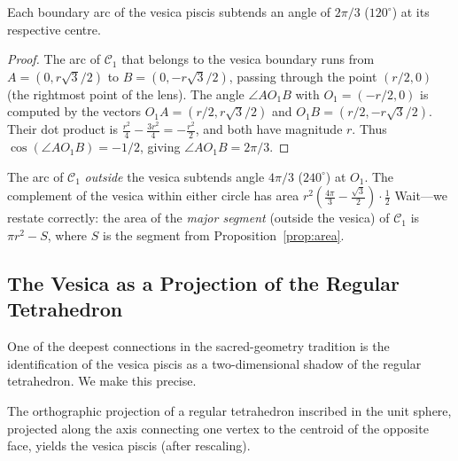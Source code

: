 \begin{lemma}\label{lem:arc-angle}
Each boundary arc of the vesica piscis subtends an angle of
\(2\pi/3\) (\(120^\circ\)) at its respective centre.
\end{lemma}

\begin{proof}
The arc of \(\mathcal{C}_1\) that belongs to the vesica boundary
runs from \(A = (0, r\sqrt{3}/2)\) to \(B = (0, -r\sqrt{3}/2)\),
passing through the point \((r/2, 0)\) (the rightmost point of the
lens).
The angle \(\angle A O_1 B\) with \(O_1 = (-r/2, 0)\) is computed by the
vectors \(O_1 A = (r/2, r\sqrt{3}/2)\) and \(O_1 B = (r/2, -r\sqrt{3}/2)\).
Their dot product is
\(\frac{r^2}{4} - \frac{3r^2}{4} = -\frac{r^2}{2}\),
and both have magnitude \(r\).
Thus \(\cos(\angle A O_1 B) = -1/2\), giving
\(\angle A O_1 B = 2\pi/3\).
\end{proof}

\begin{corollary}\label{cor:supplementary}
The arc of \(\mathcal{C}_1\) \emph{outside} the vesica subtends angle
\(4\pi/3\) (\(240^\circ\)) at \(O_1\).
The complement of the vesica within either circle has area
\(r^2(\tfrac{4\pi}{3} - \tfrac{\sqrt{3}}{2}) \cdot \tfrac{1}{2}\)
Wait—we restate correctly:
the area of the \emph{major segment} (outside the vesica) of \(\mathcal{C}_1\)
is \(\pi r^2 - S\), where \(S\) is the segment from Proposition~\ref{prop:area}.
\end{corollary}

\subsection{The Vesica as a Projection of the Regular Tetrahedron}
\label{subsec:ch11-tetrahedron}

One of the deepest connections in the sacred-geometry tradition is the
identification of the vesica piscis as a two-dimensional shadow of the
regular tetrahedron.
We make this precise.

\begin{theorem}\label{thm:tetrahedron}
The orthographic projection of a regular tetrahedron inscribed in the
unit sphere, projected along the axis connecting one vertex to the
centroid of the opposite face, yields the vesica piscis (after rescaling).
\end{theorem}


